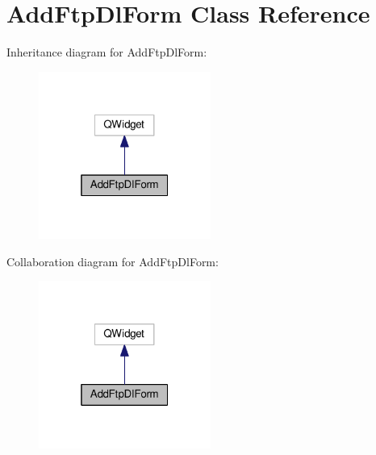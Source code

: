 \hypertarget{class_add_ftp_dl_form}{}\section{Add\+Ftp\+Dl\+Form Class Reference}
\label{class_add_ftp_dl_form}


Inheritance diagram for Add\+Ftp\+Dl\+Form\+:
\nopagebreak
\begin{figure}[H]
\begin{center}
\leavevmode
\includegraphics[width=160pt]{class_add_ftp_dl_form__inherit__graph}
\end{center}
\end{figure}


Collaboration diagram for Add\+Ftp\+Dl\+Form\+:
\nopagebreak
\begin{figure}[H]
\begin{center}
\leavevmode
\includegraphics[width=160pt]{class_add_ftp_dl_form__coll__graph}
\end{center}
\end{figure}
